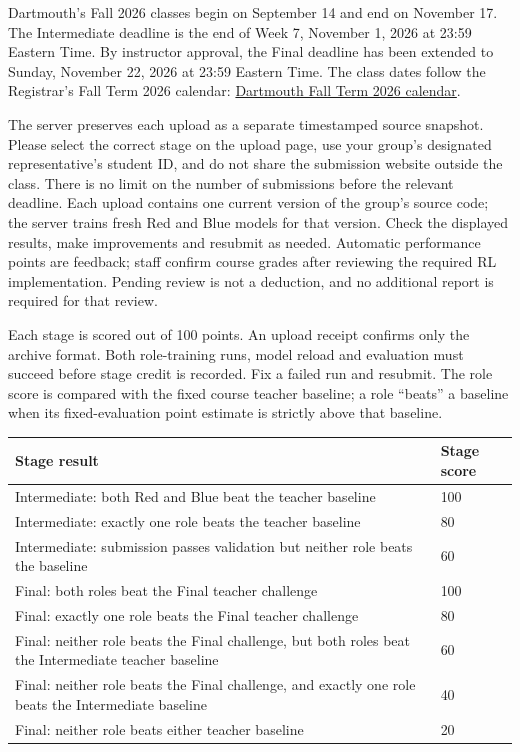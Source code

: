 \documentclass[12pt]{report}
\begin{document}
Dartmouth's Fall 2026 classes begin on September 14 and end on November 17.
The Intermediate deadline is the end of Week 7, November 1, 2026 at 23:59
Eastern Time. By instructor approval, the Final deadline has been extended to
Sunday, November 22, 2026 at 23:59 Eastern Time. The class dates follow the Registrar's Fall Term 2026
calendar: \href{https://registrar.dartmouth.edu/calendars/academic-institutional-calendars/2026-2027-key-dates/fall-term-2026}{Dartmouth Fall Term 2026 calendar}.

The server preserves each upload as a separate timestamped source snapshot.
Please select the correct stage on the upload page, use your group's designated
representative's student ID, and do not share the submission website outside the
class. There is no limit on the number of submissions before the relevant
deadline. Each upload contains one current version of the group's source code;
the server trains fresh Red and Blue models for that version. Check the displayed
results, make improvements and resubmit as needed. Automatic performance points
are feedback; staff confirm course grades after reviewing the required RL
implementation. Pending review is not a deduction, and no additional report is
required for that review.

Each stage is scored out of 100 points. An upload receipt confirms only the
archive format. Both role-training runs, model reload and evaluation must
succeed before stage credit is recorded. Fix a failed run and resubmit.
The role score is compared with the fixed course teacher baseline; a role
``beats'' a baseline when its fixed-evaluation point estimate is strictly above
that baseline.

\begin{center}
\begin{tabular}{>{\raggedright\arraybackslash}p{}p{}}
\toprule
\textbf{Stage result} & \textbf{Stage score} \\
\midrule
Intermediate: both Red and Blue beat the teacher baseline & 100 \\
Intermediate: exactly one role beats the teacher baseline & 80 \\
Intermediate: submission passes validation but neither role beats the baseline & 60 \\
\midrule
Final: both roles beat the Final teacher challenge & 100 \\
Final: exactly one role beats the Final teacher challenge & 80 \\
Final: neither role beats the Final challenge, but both roles beat the Intermediate teacher baseline & 60 \\
Final: neither role beats the Final challenge, and exactly one role beats the Intermediate baseline & 40 \\
Final: neither role beats either teacher baseline & 20 \\
\bottomrule
\end{tabular}
\end{center}
\end{document}
